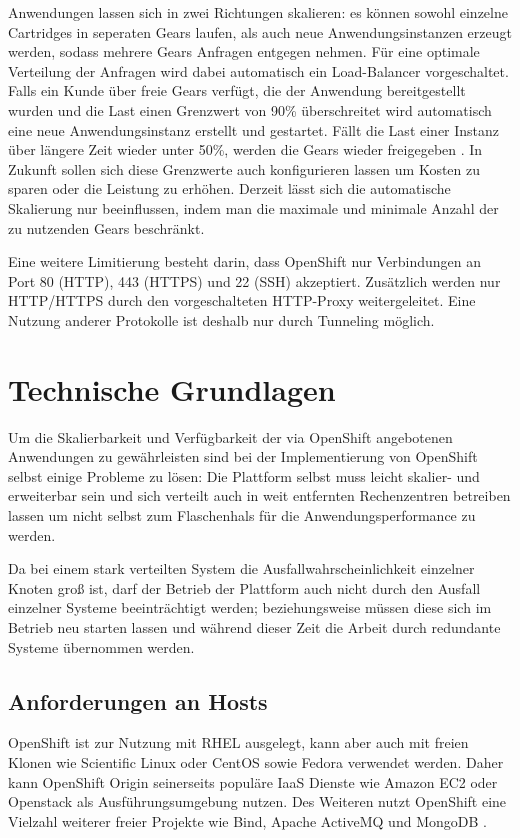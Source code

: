 \documentclass[10pt,a4paper,compsoc]{IEEEtran}
\begin{document}
Anwendungen lassen sich in zwei Richtungen skalieren: es können sowohl einzelne Cartridges in seperaten Gears laufen, als auch neue Anwendungsinstanzen erzeugt werden, sodass mehrere Gears Anfragen entgegen nehmen. Für eine optimale Verteilung der Anfragen wird dabei automatisch ein Load-Balancer vorgeschaltet. Falls ein Kunde über freie Gears verfügt, die der Anwendung bereitgestellt wurden und die Last einen Grenzwert von 90\% überschreitet wird automatisch eine neue Anwendungsinstanz erstellt und gestartet. Fällt die Last einer Instanz über längere Zeit wieder unter 50\%, werden die Gears wieder freigegeben \cite{os_scaling}. In Zukunft sollen sich diese Grenzwerte auch konfigurieren lassen um Kosten zu sparen oder die Leistung zu erhöhen. Derzeit lässt sich die automatische Skalierung nur beeinflussen, indem man die maximale und minimale Anzahl der zu nutzenden Gears beschränkt.

Eine weitere Limitierung besteht darin, dass OpenShift nur Verbindungen an Port 80 (HTTP), 443 (HTTPS) und 22 (SSH) akzeptiert. Zusätzlich werden nur HTTP/HTTPS durch den vorgeschalteten HTTP-Proxy weitergeleitet. Eine Nutzung anderer Protokolle ist deshalb nur durch Tunneling möglich.

\section{Technische Grundlagen}
\label{sec:tech}
Um die Skalierbarkeit und Verfügbarkeit der via OpenShift angebotenen Anwendungen zu gewährleisten sind bei der Implementierung von OpenShift selbst einige Probleme zu lösen: Die Plattform selbst muss leicht skalier- und erweiterbar sein und sich verteilt auch in weit entfernten Rechenzentren betreiben lassen um nicht selbst zum Flaschenhals für die Anwendungsperformance zu werden.

Da bei einem stark verteilten System die Aus\-fall\-wahr\-schein\-lich\-keit einzelner Knoten groß ist, darf der Betrieb der Plattform auch nicht durch den Ausfall einzelner Systeme beeinträchtigt werden; beziehungsweise müssen diese sich im Betrieb neu starten lassen und während dieser Zeit die Arbeit durch redundante Systeme übernommen werden.

\subsection{Anforderungen an Hosts}
OpenShift ist zur Nutzung mit RHEL ausgelegt, kann aber auch mit freien Klonen wie Scientific Linux oder CentOS sowie Fedora verwendet werden. Daher kann OpenShift Origin seinerseits populäre IaaS Dienste wie Amazon EC2 oder Openstack als Ausführungsumgebung nutzen. Des Weiteren nutzt OpenShift eine Vielzahl weiterer freier Projekte wie Bind, Apache ActiveMQ und MongoDB \cite[3.1]{os_buildyourown}.
\end{document}
